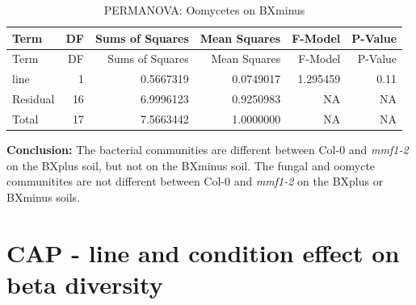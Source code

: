 \documentclass[
  11pt,
]{article}
\begin{document}
\begin{longtable}[]{@{}lrrrrr@{}}
\caption{PERMANOVA: Oomycetes on BXminus}\tabularnewline
\toprule\noalign{}
Term & DF & Sums of Squares & Mean Squares & F-Model & P-Value \\
\midrule\noalign{}
\endfirsthead
\toprule\noalign{}
Term & DF & Sums of Squares & Mean Squares & F-Model & P-Value \\
\midrule\noalign{}
\endhead
\bottomrule\noalign{}
\endlastfoot
line & 1 & 0.5667319 & 0.0749017 & 1.295459 & 0.11 \\
Residual & 16 & 6.9996123 & 0.9250983 & NA & NA \\
Total & 17 & 7.5663442 & 1.0000000 & NA & NA \\
\end{longtable}

\textbf{Conclusion:} The bacterial communities are different between
Col-0 and \emph{mmf1-2} on the BXplus soil, but not on the BXminus soil.
The fungal and oomycte communitites are not different between Col-0 and
\emph{mmf1-2} on the BXplus or BXminus soils.

\section{\texorpdfstring{\textbf{CAP - line and condition effect on beta
diversity}}{CAP - line and condition effect on beta diversity}}\label{cap---line-and-condition-effect-on-beta-diversity}
\end{document}

